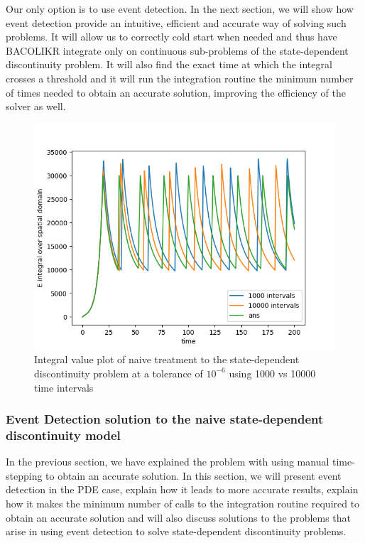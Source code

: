 \documentclass{article}
\begin{document}
Our only option is to use event detection. In the next section, we will show how event detection provide an intuitive, efficient and accurate way of solving such problems. It will allow us to correctly cold start when needed and thus have BACOLIKR integrate only on continuous sub-problems of the state-dependent discontinuity problem. It will also find the exact time at which the integral crosses a threshold and it will run the integration routine the minimum number of times needed to obtain an accurate solution, improving the efficiency of the solver as well.

\begin{figure}[H]
\centering
\includegraphics[width=0.7\linewidth]{./figures/pde_state_disc_naive_1000vs10000}
\caption{Integral value plot of naive treatment to the state-dependent discontinuity problem at a tolerance of $10^{-6}$ using 1000 vs 10000 time intervals}
\label{fig:pde_state_disc_naive_1000vs10000}
\end{figure}

\subsubsection{Event Detection solution to the naive state-dependent discontinuity model}
\label{subsubsection:pde_state_event_detection}
In the previous section, we have explained the problem with using manual time-stepping to obtain an accurate solution. In this section, we will present event detection in the PDE case, explain how it leads to more accurate results, explain how it makes the minimum number of calls to the integration routine required to obtain an accurate solution and will also discuss solutions to the problems that arise in using event detection to solve state-dependent discontinuity problems.
\end{document}
